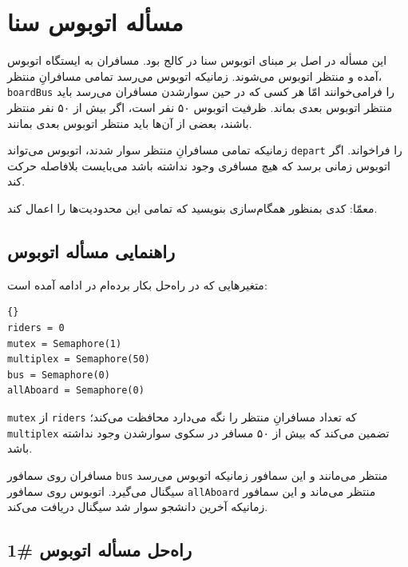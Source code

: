 \documentclass{book}
\newcommand{\clearemptydoublepage}{}%
\begin{document}
\section{مسأله اتوبوس سنا\footnotemark}

    این مسأله در اصل بر مبنای اتوبوس سنا در کالج  بود.
    مسافران به ایستگاه اتوبوس آمده و منتظر اتوبوس می‌شوند. زمانیکه اتوبوس می‌رسد تمامی مسافرانِ منتظر، {\tt boardBus} را فرامی‌خوانند امّا 
    هر کسی که در حین سوارشدن مسافران می‌رسد باید منتظر اتوبوس بعدی بماند. ظرفیت اتوبوس ۵۰ نفر است، اگر بیش از ۵۰ نفر منتظر باشند، 
    بعضی از آن‌ها باید منتظر اتوبوس بعدی بمانند. 

    زمانیکه تمامی مسافرانِ منتظر سوار شدند، اتوبوس می‌تواند  {\tt depart} را فراخواند. 
    اگر اتوبوس زمانی برسد که هیچ مسافری وجود نداشته باشد می‌بایست بلافاصله  حرکت کند. 

    معمّا: کدی بمنظور همگام‌سازی بنویسید که تمامی این محدودیت‌ها را اعمال کند. 


\clearemptydoublepage
\subsection {راهنمایی مسأله اتوبوس}

    متغیرهایی که در راه‌حل بکار برده‌ام در ادامه آمده است: 

\begin{latin}
\begin{lstlisting}[title=\rl{راهنمای مسأله اتوبوس}]{}
riders = 0
mutex = Semaphore(1)
multiplex = Semaphore(50)
bus = Semaphore(0)
allAboard = Semaphore(0)
\end{lstlisting}
\end{latin}

    {\tt mutex}
    از  {\tt riders} که تعداد مسافرانِ منتظر را نگه می‌دارد محافظت می‌کند؛ {\tt multiplex} تضمین می‌کند که بیش از ۵۰ مسافر در 
    سکوی  سوارشدن وجود نداشته باشد. 
    

    مسافران روی سمافور {\tt bus} منتظر می‌مانند و این سمافور زمانیکه اتوبوس می‌رسد سیگنال می‌گیرد. 
    اتوبوس روی سمافور {\tt allAboard} منتظر می‌ماند و این سمافور زمانیکه آخرین دانشجو سوار شد سیگنال دریافت می‌کند. 


\clearemptydoublepage
\subsection {راه‌حل مسأله اتوبوس \#1}
\end{document}
